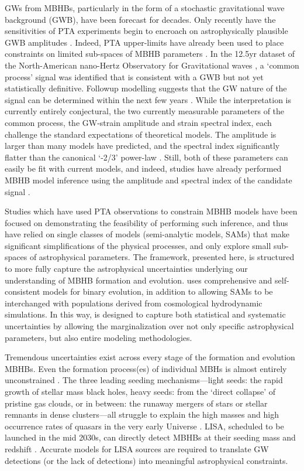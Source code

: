 \documentclass[useAMS, usenatbib]{mnras}
\begin{document}
    GWs from MBHBs, particularly in the form of a stochastic gravitational wave background (GWB), have been forecast for decades.  Only recently have the sensitivities of PTA experiments begin to encroach on astrophysically plausible GWB amplitudes  .  Indeed, PTA upper-limits have already been used to place constraints on limited sub-spaces of MBHB parameters .  In the 12.5yr dataset of the North-American nano-Hertz Observatory for Gravitational waves , a `common process' signal was identified that is consistent with a GWB but not yet statistically definitive.  Followup modelling suggests that the GW nature of the signal can be determined within the next few years .  While the interpretation is currently entirely conjectural, the two currently measurable parameters of the common process, the GW-strain amplitude and strain spectral index, each challenge the standard expectations of theoretical models.  The  amplitude is larger than many models have predicted, and the spectral index significantly flatter than the canonical `-2/3' power-law  .  Still, both of these parameters can easily be fit with current models, and indeed, studies have already performed MBHB model inference using the amplitude and spectral index of the candidate  signal .

    Studies which have used PTA observations to constrain MBHB models have been focused on demonstrating the feasibility of performing such inference, and thus have relied on single classes of models (semi-analytic models, SAMs) that make significant simplifications of the physical processes, and only explore small sub-spaces of astrophysical parameters.  The \holodeck{} framework, presented here, is structured to more fully capture the astrophysical uncertainties underlying our understanding of MBHB formation and evolution.  \holodeck{} uses comprehensive and self-consistent models for binary evolution, in addition to allowing SAMs to be interchanged with populations derived from cosmological hydrodynamic simulations.  In this way, \holodeck{} is designed to capture both statistical and systematic uncertainties by allowing the marginalization over not only specific astrophysical parameters, but also entire modeling methodologies.

    Tremendous uncertainties exist across every stage of the formation and evolution MBHBs.  Even the formation process(es) of individual MBHs is almost entirely unconstrained \needcite{}.  The three leading seeding mechanisms---light seeds: the rapid growth of stellar mass black holes, heavy seeds: from the `direct collapse' of pristine gas clouds, or in between: the runaway mergers of stars or stellar remnants in dense clusters---all struggle to explain the high masses and high occurrence rates of quasars in the very early Universe \needcite{}.  LISA, scheduled to be launched in the mid 2030s, can directly detect MBHBs at their seeding mass and redshift \needcite{}.  Accurate models for LISA sources are required to translate GW detections (or the lack of detections) into meaningful astrophysical constraints.
\end{document}

